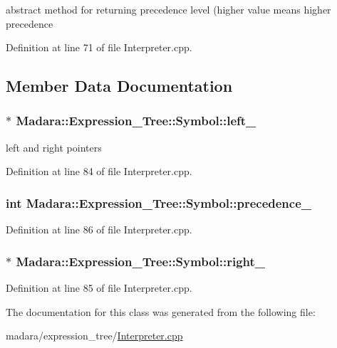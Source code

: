 abstract method for returning precedence level (higher value means higher precedence 



Definition at line 71 of file Interpreter.cpp.



\subsection{Member Data Documentation}
\hypertarget{classMadara_1_1Expression__Tree_1_1Symbol_a7808eb3daad675e2e01409f173a41cee}{
\subsubsection[{left\_\-}]{$\ast$ {\bf Madara::Expression\_\-Tree::Symbol::left\_\-}}}
\label{d5/d85/classMadara_1_1Expression__Tree_1_1Symbol_a7808eb3daad675e2e01409f173a41cee}


left and right pointers 



Definition at line 84 of file Interpreter.cpp.

\hypertarget{classMadara_1_1Expression__Tree_1_1Symbol_a2de31139261eea47dccd48d377780803}{
\subsubsection[{precedence\_\-}]{\setlength{\rightskip}{0pt plus 5cm}int {\bf Madara::Expression\_\-Tree::Symbol::precedence\_\-}}}
\label{d5/d85/classMadara_1_1Expression__Tree_1_1Symbol_a2de31139261eea47dccd48d377780803}


Definition at line 86 of file Interpreter.cpp.

\hypertarget{classMadara_1_1Expression__Tree_1_1Symbol_a13467d1c78fbf06c3d64a6a4770eee7a}{
\subsubsection[{right\_\-}]{$\ast$ {\bf Madara::Expression\_\-Tree::Symbol::right\_\-}}}
\label{d5/d85/classMadara_1_1Expression__Tree_1_1Symbol_a13467d1c78fbf06c3d64a6a4770eee7a}


Definition at line 85 of file Interpreter.cpp.



The documentation for this class was generated from the following file:\begin{DoxyCompactItemize}
\item 
madara/expression\_\-tree/\hyperlink{Interpreter_8cpp}{Interpreter.cpp}\end{DoxyCompactItemize}
